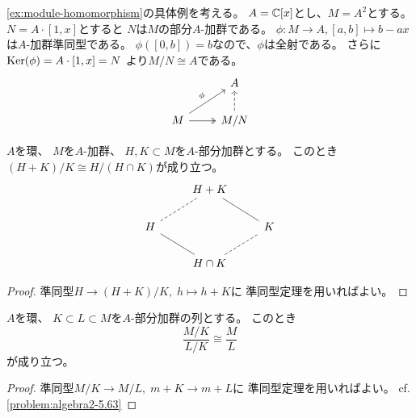 \documentclass[report]{jlreq}
\begin{document}
\begin{example}[準同型定理の例]
    \cref{ex:module-homomorphism}の具体例を考える。
    $A = \mathbb{C}[x]$とし、$M = A^2$とする。
    $N = A \cdot [1, x]$とすると
    $N$は$M$の部分$A$-加群である。
    $\phi \colon M \to A, [a, b] \mapsto b - ax$は$A$-加群準同型である。
    $\phi([0, b]) = b$なので、$\phi$は全射である。
    さらに$\operatorname{\mathrm{Ker}}(\phi) = A \cdot [1, x] = N$
    より$M/N \cong A$である。
    \begin{equation}
        \begin{tikzcd}
            & A \\
            M \ar{ru}{\phi} \ar[two heads]{r} & M/N \ar[dashed]{u}
        \end{tikzcd}
    \end{equation}
\end{example}

\begin{theorem}
    $A$を環、
    $M$を$A$-加群、
    $H, K \subset M$を$A$-部分加群とする。
    このとき$(H + K) / K \cong H / (H \cap K)$が成り立つ。
    \begin{equation}
        \begin{tikzcd}
            & H + K \\
            H \ar[dashed, no head]{ru}
                && K \ar[dash]{lu} \\
            & H \cap K \ar[dash]{lu} \ar[dashed, no head]{ru}
        \end{tikzcd}
    \end{equation}
\end{theorem}

\begin{proof}
    準同型$H \to (H + K) / K, \; h \mapsto h + K$に
    準同型定理を用いればよい。
\end{proof}

\begin{theorem}[第3同型定理]
    $A$を環、
    $K \subset L \subset M$を$A$-部分加群の列とする。
    このとき
    \begin{equation}
        \frac{M / K}{L / K} \cong \frac{M}{L}
    \end{equation}
    が成り立つ。
\end{theorem}

\begin{proof}
    準同型$M / K \to M / L, \; m + K \to m + L$に
    準同型定理を用いればよい。
    cf. \cref{problem:algebra2-5.63}
\end{proof}
\end{document}
